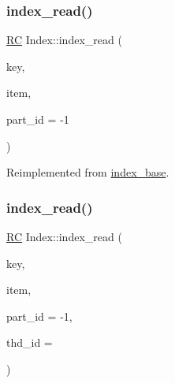 \mbox{\label{classIndex_ab930b74f611f4704fa1fb9a8bb9f57f8}} 
\subsubsection{\texorpdfstring{index\+\_\+read()}{index\_read()}\hspace{0.1cm}{\footnotesize\ttfamily [1/3]}}
{\footnotesize\ttfamily \hyperlink{global_8h_a78c49a674c810fdd03d20432f7be864a}{RC} Index\+::index\+\_\+read (\begin{DoxyParamCaption}\item[{\hyperlink{index__base_8h_ae35c40bc2f912c11f0e36ac66cba4489}{K\+E\+Y\+\_\+\+T\+Y\+PE}}]{key,  }\item[{\hyperlink{microbench_2main_8cpp_ae17cb099b4c9aee7835032339b5a9e0d}{V\+A\+L\+U\+E\+\_\+\+T\+Y\+PE} $\ast$}]{item,  }\item[{int}]{part\+\_\+id = {\ttfamily -\/1} }\end{DoxyParamCaption})\hspace{0.3cm}{\ttfamily [virtual]}}



Reimplemented from \hyperlink{classindex__base_a044a748df8945a60af8ab815b555960a}{index\+\_\+base}.

\mbox{\label{classIndex_abb1666dd897887f22d8e4dc92966b207}} 
\subsubsection{\texorpdfstring{index\+\_\+read()}{index\_read()}\hspace{0.1cm}{\footnotesize\ttfamily [2/3]}}
{\footnotesize\ttfamily \hyperlink{global_8h_a78c49a674c810fdd03d20432f7be864a}{RC} Index\+::index\+\_\+read (\begin{DoxyParamCaption}\item[{\hyperlink{index__base_8h_ae35c40bc2f912c11f0e36ac66cba4489}{K\+E\+Y\+\_\+\+T\+Y\+PE}}]{key,  }\item[{\hyperlink{microbench_2main_8cpp_ae17cb099b4c9aee7835032339b5a9e0d}{V\+A\+L\+U\+E\+\_\+\+T\+Y\+PE} $\ast$}]{item,  }\item[{int}]{part\+\_\+id = {\ttfamily -\/1},  }\item[{int}]{thd\+\_\+id = {} }\end{DoxyParamCaption})\hspace{0.3cm}{\ttfamily [virtual]}}



